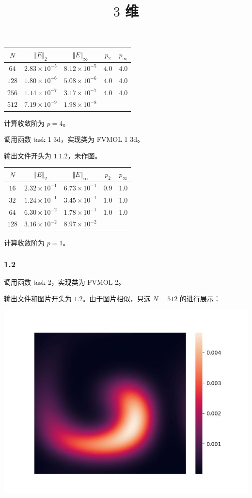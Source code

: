 \documentclass[12pt]{ctexart}
\begin{document}
\begin{tabular}{c|c|c|c|c}
	$N$   &  $\Vert E\Vert _2$    &  $\Vert E\Vert_\infty$  &  $p_2$&  $p_\infty$  \\
	\hline
	$64$   &  $2.83\times 10^{-5}$    &  $8.12\times 10^{-5}$  & $4.0$ & $4.0$ \\
	$128$   &  $1.80\times 10^{-6}$    &  $5.08\times 10^{-6}$  & $4.0$  & $4.0$ \\
	$256$   &  $1.14\times 10^{-7}$    &  $3.17\times 10^{-7}$  & $4.0$ & $4.0$ \\
	$512$   &  $7.19\times 10^{-9}$    &  $1.98\times 10^{-8}$  &   & \\
\end{tabular}

计算收敛阶为 $p=4$。

\title{$3$ 维}

调用函数 task 1 3d，实现类为 FVMOL 1 3d。

输出文件开头为 $1.1.2$，未作图。

\begin{tabular}{c|c|c|c|c}
	$N$   &  $\Vert E\Vert _2$    &  $\Vert E\Vert_\infty$  &  $p_2$&  $p_\infty$  \\
	\hline
	$16$   &  $2.32\times 10^{-1}$    &  $6.73\times 10^{-1}$  & $0.9$ & $1.0$ \\
	$32$   &  $1.24\times 10^{-1}$    &  $3.45\times 10^{-1}$  & $1.0$  & $1.0$ \\
	$64$   &  $6.30\times 10^{-2}$    &  $1.78\times 10^{-1}$  & $1.0$ & $1.0$ \\
	$128$   &  $3.16\times 10^{-2}$    &  $8.97\times 10^{-2}$  &   & \\
\end{tabular}

计算收敛阶为 $p=1$。

\subsubsection*{1.2}

调用函数 task 2，实现类为 FVMOL 2。

输出文件和图片开头为 $1.2$。由于图片相似，只选 $N=512$ 的进行展示：

\includegraphics[scale=0.8]{1.2(N=512).jpg}
\end{document}
